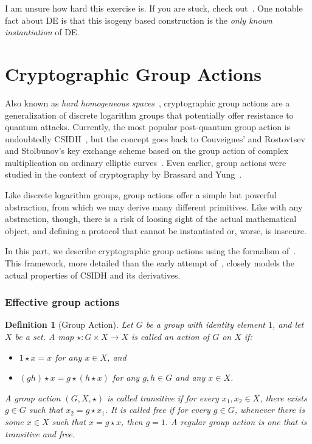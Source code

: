 \documentclass{article}
\newtheorem{defi}{Definition}
\begin{document}
I am unsure how hard this exercise is.  If you are stuck, check
out~\cite[\S~3]{EPRINT:BurDeF20}.  One notable fact about DE is that this
isogeny based construction is the \emph{only known instantiation} of
DE.


\part{Cryptographic Group Actions}

Also known as \emph{hard homogeneous
  spaces}~\cite{EPRINT:Couveignes06}, cryptographic group actions are
a generalization of discrete logarithm groups that potentially offer
resistance to quantum attacks.  Currently, the most popular
post-quantum group action is undoubtedly CSIDH~\cite{AC:CLMPR18}, but
the concept goes back to Couveignes' and Rostovtsev and Stolbunov's
key exchange scheme based on the group action of complex
multiplication on ordinary elliptic
curves~\cite{EPRINT:Couveignes06,EPRINT:RosSto06}.  Even earlier,
group actions were studied in the context of cryptography by Brassard
and Yung~\cite{C:BraYun90}.

Like discrete logarithm groups, group actions offer a simple but
powerful abstraction, from which we may derive many different
primitives. Like with any abstraction, though, there is a risk of
loosing sight of the actual mathematical object, and defining a
protocol that cannot be instantiated or, worse, is insecure.

In this part, we describe cryptographic group actions using the
formalism of~\cite{AC:ADMP20}.  This framework, more detailed than the
early attempt of~\cite{EPRINT:Couveignes06}, closely models the actual
properties of CSIDH and its derivatives.


\section{Effective group actions}

\begin{defi}[Group Action]
  Let $G$ be a group with identity element $1$, and let $X$ be a
  set. %
  A map $\star : G \times X \to X$ is called an \emph{action of $G$ on
    $X$} if:
  \begin{itemize}
  \item $1 \star x = x$ for any $x\in X$, and
  \item $(g h) \star x=g \star (h \star x)$ for any $g,h\in G$ and any
    $x\in X$.
  \end{itemize}
  
  A group action $(G,X,\star)$ is called \emph{transitive} if for
  every $x_1,x_2\in X$, there exists $g\in G$ such that
  $x_2 = g \star x_1$. %
  It is called \emph{free} if for every $g\in G$, whenever there is
  some $x\in X$ such that $x = g \star x$, then $g=1$. %
  A \emph{regular} group action is one that is transitive and free.
\end{defi}
\end{document}
